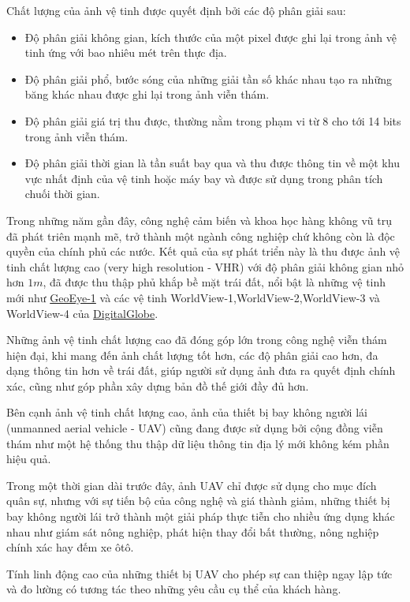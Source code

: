 \documentclass[14pt, oneside, a4paper, openany]{scrartcl}
\begin{document}
Chất lượng của ảnh vệ tinh được quyết định bởi các độ phân giải sau:
\begin{itemize}
	\item Độ phân giải không gian, kích thước của một pixel được ghi lại trong ảnh vệ tinh ứng với bao nhiêu mét trên thực địa.
	\item Độ phân giải phổ, bước sóng của những giải tần số khác nhau tạo ra những băng khác nhau được ghi lại trong ảnh viễn thám.
	\item Độ phân giải giá trị thu được, thường nằm trong phạm vi từ 8 cho tới 14 bits trong ảnh viễn thám.
	\item Độ phân giải thời gian là tần suất bay qua và thu được thông tin về một khu vực nhất định của vệ tinh hoặc máy bay và được sử dụng trong phân tích chuối thời gian.
\end{itemize}
Trong những năm gần đây, công nghệ cảm biến và khoa học hàng không vũ trụ đã phát triên mạnh mẽ, trở thành một ngành công nghiệp chứ không còn là độc quyền của chính phủ các nước. Kết quả của sự phát triển này là thu được ảnh vệ tinh chất lượng cao (very high resolution - VHR) với độ phân giải không gian nhỏ hơn $1m$, đã được thu thập phủ khắp bề mặt trái đất, nổi bật là những vệ tinh mới như \href{http://www.satimagingcorp.com/gallery/geoeye-1/}{GeoEye-1} và các vệ tinh WorldView-1,WorldView-2,WorldView-3 và WorldView-4 của \href{https://www.digitalglobe.com/}{DigitalGlobe}.

Những ảnh vệ tinh chất lượng cao đã đóng góp lớn trong công nghệ viễn thám hiện đại, khi mang đến ảnh chất lượng tốt hơn, các độ phân giải cao hơn, đa dạng thông tin hơn về trái đất, giúp người sử dụng ảnh đưa ra quyết định chính xác, cũng như góp phần xây dựng bản đồ thế giới đầy đủ hơn.

Bên cạnh ảnh vệ tinh chất lượng cao, ảnh của thiết bị bay không người lái (unmanned aerial vehicle - UAV) cũng đang được sử dụng bởi cộng đồng viễn thám như một hệ thống thu thập dữ liệu thông tin địa lý mới không kém phần hiệu quả.

Trong một thời gian dài trước đây, ảnh UAV chỉ được sử dụng cho mục đích quân sự, nhưng với sự tiến bộ của công nghệ và giá thành giảm, những thiết bị bay không người lái trở thành một giải pháp thực tiễn cho nhiều ứng dụng khác nhau như giám sát nông nghiệp, phát hiện thay đổi bất thường, nông nghiệp chính xác hay đếm xe ôtô.

Tính linh động cao của những thiết bị UAV cho phép sự can thiệp ngay lập tức và đo lường có tương tác theo những yêu cầu cụ thể của khách hàng.
\end{document}
